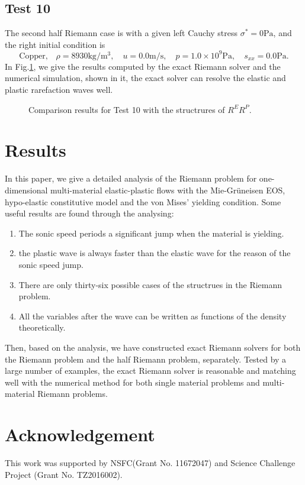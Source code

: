 \documentclass{article}
\numberwithin{equation}{section}
\numberwithin{table}{section}
\begin{document}
\subsection{Test 10}
The second half Riemann case is with  a given left Cauchy stress $\sigma^* = 0 \text{Pa}$, and the right initial condition is
\begin{equation}
  \text{Copper,}\quad\rho = 8930\text{kg}/\text{m}^3, \quad  u = 0.0\text{m}/\text{s}, \quad  p =1.0\times 10^9 \text{Pa}, \quad  s_{xx}=0.0\text{Pa}.
\end{equation}
In Fig.\ref{fig:case10}, we give the results computed by the exact Riemann solver and the numerical simulation, shown in it, the exact solver can resolve the elastic and plastic rarefaction waves well.
\begin{figure}
  \centering
    \caption{Comparison results for Test 10 with the structrures of $R^ER^P$.  }
  \label{fig:case10}
\end{figure}
\section{Results}
In this paper, we give a detailed analysis of the Riemann problem for one-dimensional  multi-material elastic-plastic flows with the  Mie-Gr\"uneisen EOS, hypo-elastic constitutive model and the von Mises' yielding condition.  Some useful results are found through the analysing:
\begin{enumerate}
	\item The sonic speed periods a significant jump when the material is yielding.
	\item the plastic wave is always faster than the elastic wave for the reason of the sonic speed jump.
	
	  \item There are only thirty-six possible cases of the structrues in the Riemann problem.
	\item All the variables after the wave can be written as functions of the density theoretically.
	\end{enumerate}
	  Then, based on the analysis, we have constructed exact Riemann solvers for  both the Riemann problem  and the half Riemann problem, separately. Tested by  a large number of examples, the exact Riemann solver is reasonable and matching  well with the numerical method for both  single material problems and multi-material Riemann problems.

\section*{Acknowledgement}
This work was supported by NSFC(Grant No. 11672047) and Science Challenge Project (Grant No. TZ2016002).


  \appendix
  \renewcommand{\appendixname}{Appendix~}
\end{document}
